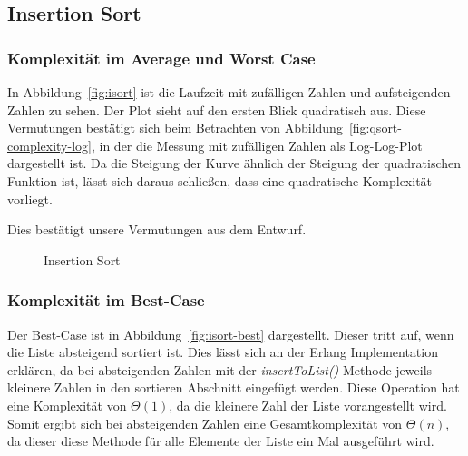 
\subsection{Insertion Sort}\label{subsec:insertion-sort-laufzeit}

\subsubsection{Komplexität im Average und Worst Case}
In Abbildung~\ref{fig:isort} ist die Laufzeit mit zufälligen Zahlen und
aufsteigenden Zahlen zu sehen.
Der Plot sieht auf den ersten Blick quadratisch aus.
Diese Vermutungen bestätigt sich beim Betrachten von
Abbildung~\ref{fig:qsort-complexity-log}, in der die Messung mit zufälligen
Zahlen als Log-Log-Plot dargestellt ist. Da die Steigung der Kurve ähnlich
der Steigung der quadratischen Funktion ist, lässt sich daraus schließen,
dass eine quadratische Komplexität vorliegt.

Dies bestätigt unsere Vermutungen aus dem Entwurf.
\begin{figure}[hbt]
    \centering
    \caption{Insertion Sort}
    \hfill
\end{figure}

\subsubsection{Komplexität im Best-Case}
Der Best-Case ist in Abbildung~\ref{fig:isort-best} dargestellt.
Dieser tritt auf, wenn die Liste absteigend sortiert ist.
Dies lässt sich an der Erlang Implementation erklären, da bei absteigenden
Zahlen mit der \textit{insertToList()} Methode jeweils kleinere Zahlen in den
sortieren Abschnitt eingefügt werden.
Diese Operation hat eine Komplexität von \(\Theta(1)\), da die kleinere Zahl
der Liste vorangestellt wird.
Somit ergibt sich bei absteigenden Zahlen eine Gesamtkomplexität von
\(\Theta(n)\), da dieser diese Methode für alle Elemente der Liste ein Mal
ausgeführt wird.


